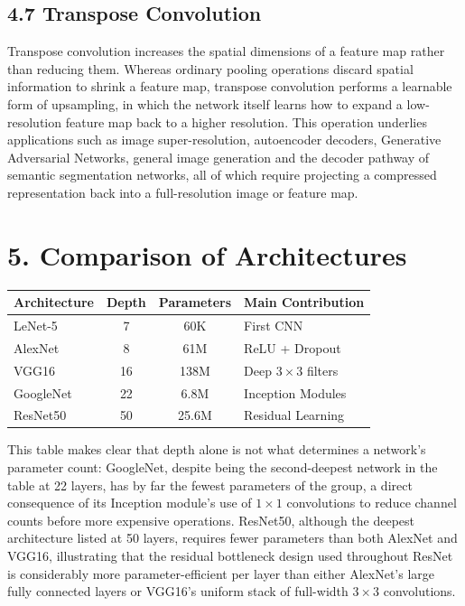 \documentclass[11pt,a4paper]{article}
\begin{document}
\subsection*{4.7 Transpose Convolution}

Transpose convolution increases the spatial dimensions of a feature map rather than reducing them. Whereas ordinary pooling operations discard spatial information to shrink a feature map, transpose convolution performs a learnable form of upsampling, in which the network itself learns how to expand a low-resolution feature map back to a higher resolution. This operation underlies applications such as image super-resolution, autoencoder decoders, Generative Adversarial Networks, general image generation and the decoder pathway of semantic segmentation networks, all of which require projecting a compressed representation back into a full-resolution image or feature map.

\section*{5. Comparison of Architectures}

\begin{center}
\begin{tabular}{|p{3cm}|c|c|p{5cm}|}
\hline
\textbf{Architecture} & \textbf{Depth} & \textbf{Parameters} & \textbf{Main Contribution}\\
\hline
LeNet-5 & 7 & 60K & First CNN\\
\hline
AlexNet & 8 & 61M & ReLU + Dropout\\
\hline
VGG16 & 16 & 138M & Deep $3\times3$ filters\\
\hline
GoogleNet & 22 & 6.8M & Inception Modules\\
\hline
ResNet50 & 50 & 25.6M & Residual Learning\\
\hline
\end{tabular}
\end{center}

\vspace{0.15cm}

This table makes clear that depth alone is not what determines a network's parameter count: GoogleNet, despite being the second-deepest network in the table at 22 layers, has by far the fewest parameters of the group, a direct consequence of its Inception module's use of $1\times1$ convolutions to reduce channel counts before more expensive operations. ResNet50, although the deepest architecture listed at 50 layers, requires fewer parameters than both AlexNet and VGG16, illustrating that the residual bottleneck design used throughout ResNet is considerably more parameter-efficient per layer than either AlexNet's large fully connected layers or VGG16's uniform stack of full-width $3\times3$ convolutions.
\end{document}

